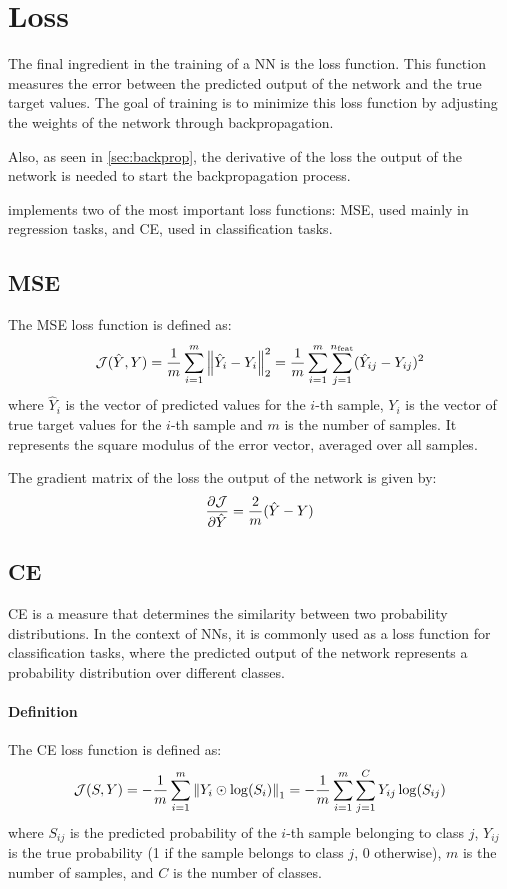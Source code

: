 \section{Loss} \label{sec:loss}

The final ingredient in the training of a \acl{NN} is the loss function. This function measures the error between the predicted output of the network and the true target values. The goal of training is to minimize this loss function by adjusting the weights of the network through backpropagation.

Also, as seen in \cref{sec:backprop}, the derivative of the loss \wrt the output of the network is needed to start the backpropagation process.

\mfnet implements two of the most important loss functions: \ac{MSE}, used mainly in regression tasks, and \ac{CE}, used in classification tasks.

\subsection{\acl{MSE}}
The \ac{MSE} loss function is defined as:
\begin{equation}
    \mathcal{J}(\hat{Y}, Y) = \frac{1}{m} \sum_{i=1}^{m} \norm{\hat{Y}_i - Y_i}_2^2 = \frac{1}{m} \sum_{i=1}^{m} \sum_{j=1}^{n_\text{feat}} (\hat{Y}_{ij} - Y_{ij})^2
\end{equation}
where $\hat{Y}_i$ is the vector of predicted values for the $i$-th sample, $Y_i$ is the vector of true target values for the $i$-th sample and $m$ is the number of samples. It represents the square modulus of the error vector, averaged over all samples.

The gradient matrix of the loss \wrt the output of the network is given by:
\begin{equation}
    \pdv{\mathcal{J}}{\hat{Y}} = \frac{2}{m} (\hat{Y} - Y)
\end{equation}

\subsection{\acl{CE}}
\acl{CE} is a measure that determines the similarity between two probability distributions. In the context of \aclp{NN}, it is commonly used as a loss function for classification tasks, where the predicted output of the network represents a probability distribution over different classes.

\paragraph{Definition}
The \ac{CE} loss function is defined as:
\begin{equation}
    \mathcal{J}(S, Y) = -\frac{1}{m} \sum_{i=1}^{m} \norm{Y_i \odot \log(S_i)}_1 = -\frac{1}{m} \sum_{i=1}^{m} \sum_{j=1}^{C} Y_{ij} \log(S_{ij})
\end{equation}
where $S_{ij}$ is the predicted probability of the $i$-th sample belonging to class $j$, $Y_{ij}$ is the true probability (1 if the sample belongs to class $j$, 0 otherwise), $m$ is the number of samples, and $C$ is the number of classes.

